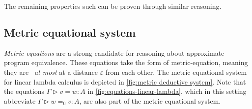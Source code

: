 The remaining properties such can be proven through similar reasoning. 


\subsection{Metric equational system}

\emph{Metric equations} \cite{mardare2016quantitative,mardare2017axiomatizability} are a strong candidate for reasoning about approximate program equivalence. These equations take the form of \gls{metric-equation}, meaning they are  \emph{at most} at a distance $\varepsilon$ from each other. The metric equational system for linear lambda calculus is depicted in \autoref{fig:metric deductive system}. 
Note that the equations $\Gamma \triangleright v = w : A$ in \autoref{fig:equations-linear-lambda}, which in this setting abbreviate $\Gamma \triangleright w =_0 v : A$, are also part of the metric equational system.


